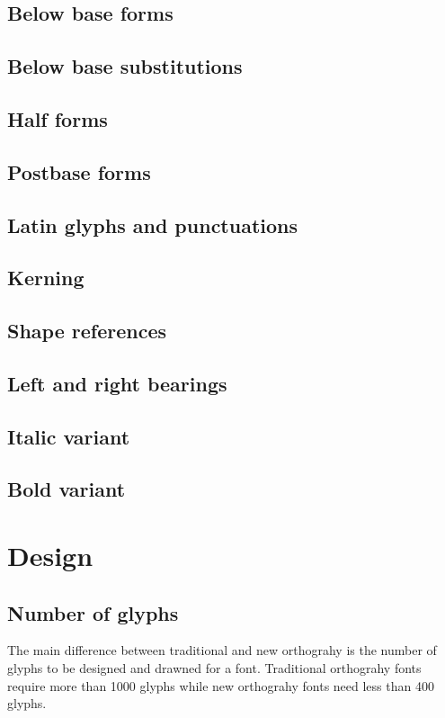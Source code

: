 \subsection {Below base forms}
\subsection {Below base substitutions}
\subsection {Half forms}
\subsection {Postbase forms}
\subsection {Latin glyphs and punctuations}
\subsection {Kerning}
\subsection {Shape references}
\subsection {Left and right bearings}
\subsection {Italic variant}
\subsection {Bold variant}

\section{Design}
\subsection{Number of glyphs}

The main difference between traditional and new orthograhy is the number of 
glyphs to be designed and drawned for a font.
Traditional orthograhy fonts require more than 1000 glyphs while new orthograhy 
fonts need less than 400 glyphs.

